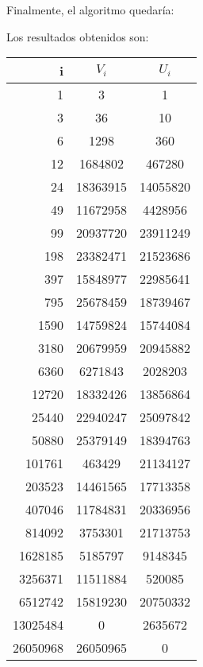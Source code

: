 \begin{enumerate}
		Finalmente, el algoritmo quedaría:
		
		Los resultados obtenidos son:
		\begin{center}
		  \begin{tabular}{ | r | c | c |}
		    \hline
		    i           & $V_i$        & $U_i$ \\
		    \hline
			1           & 3         & 1 \\
			3           & 36        & 10 \\
			6           & 1298      & 360 \\
			12          & 1684802   & 467280 \\
			24          & 18363915  & 14055820 \\
			49          & 11672958  & 4428956 \\
			99          & 20937720  & 23911249 \\
			198         & 23382471  & 21523686 \\
			397         & 15848977  & 22985641 \\
			795         & 25678459  & 18739467 \\
			1590        & 14759824  & 15744084 \\
			3180        & 20679959  & 20945882 \\
			6360        & 6271843   & 2028203 \\
			12720       & 18332426  & 13856864 \\
			25440       & 22940247  & 25097842 \\
			50880       & 25379149  & 18394763 \\
			101761      & 463429    & 21134127 \\
			203523      & 14461565  & 17713358 \\
			407046      & 11784831  & 20336956 \\
			814092      & 3753301   & 21713753 \\
			1628185     & 5185797   & 9148345 \\
			3256371     & 11511884  & 520085 \\
			6512742     & 15819230  & 20750332 \\
			13025484    & 0         & 2635672 \\
			26050968    & 26050965  & 0 \\
		    \hline
		  \end{tabular}
		\end{center}
		
    \end{enumerate}
